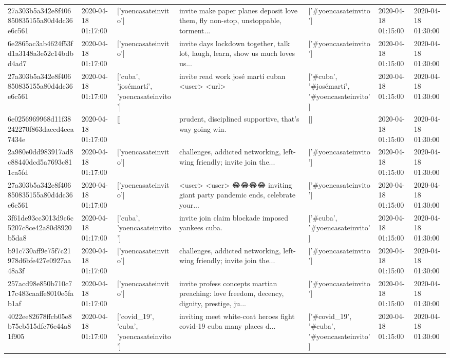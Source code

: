 \begin{tabular}{lllllll}
27a303b5a342e8f406850835155a80d4dc36e6c561 & 2020-04-18 01:17:00 & ['yoencasateinvito'] & invite make paper planes deposit love them, fly non-stop, unstoppable, torment... & ['#yoencasateinvito'] & 2020-04-18 01:15:00 & 2020-04-18 01:30:00 \\
6e2865ac3ab4624f53fd1a3148a3e52c14bdbd4ad7 & 2020-04-18 01:17:00 & ['yoencasateinvito'] & invite days lockdown together, talk lot, laugh, learn, show us much loves us... & ['#yoencasateinvito'] & 2020-04-18 01:15:00 & 2020-04-18 01:30:00 \\
27a303b5a342e8f406850835155a80d4dc36e6c561 & 2020-04-18 01:17:00 & ['cuba', 'josémartí', 'yoencasateinvito'] & invite read work josé martí cuban <user> <url> & ['#cuba', '#josémartí', '#yoencasateinvito'] & 2020-04-18 01:15:00 & 2020-04-18 01:30:00 \\
6e0256969968d11f38242270f863daccd4eea7434e & 2020-04-18 01:17:00 & [] & prudent, disciplined supportive, that's way going win. & [] & 2020-04-18 01:15:00 & 2020-04-18 01:30:00 \\
2a980e0dd983917ad8c88440dcd5a7693c811ca5fd & 2020-04-18 01:17:00 & ['yoencasateinvito'] & challenges, addicted networking, left-wing friendly; invite join the... & ['#yoencasateinvito'] & 2020-04-18 01:15:00 & 2020-04-18 01:30:00 \\
27a303b5a342e8f406850835155a80d4dc36e6c561 & 2020-04-18 01:17:00 & ['yoencasateinvito'] & <user> <user> 😂😂😂😂 inviting giant party pandemic ends, celebrate your... & ['#yoencasateinvito'] & 2020-04-18 01:15:00 & 2020-04-18 01:30:00 \\
3f61de93cc3013d9c6c5207c8ce42a80d8920b5da8 & 2020-04-18 01:17:00 & ['cuba', 'yoencasateinvito'] & invite join claim blockade imposed yankees cuba. & ['#cuba', '#yoencasateinvito'] & 2020-04-18 01:15:00 & 2020-04-18 01:30:00 \\
b91c730aff9e75f7c21978d6bfe427e0927aa48a3f & 2020-04-18 01:17:00 & ['yoencasateinvito'] & challenges, addicted networking, left-wing friendly; invite join the... & ['#yoencasateinvito'] & 2020-04-18 01:15:00 & 2020-04-18 01:30:00 \\
257acd98e850b710c717c483caaffe8010e5fab1af & 2020-04-18 01:17:00 & ['yoencasateinvito'] & invite profess concepts martian preaching: love freedom, decency, dignity, prestige, ju... & ['#yoencasateinvito'] & 2020-04-18 01:15:00 & 2020-04-18 01:30:00 \\
4022ee82678ffcb05e8b75eb515dfc76e44a81f905 & 2020-04-18 01:17:00 & ['covid_19', 'cuba', 'yoencasateinvito'] & inviting meet white-coat heroes fight covid-19 cuba many places d... & ['#covid_19', '#cuba', '#yoencasateinvito'] & 2020-04-18 01:15:00 & 2020-04-18 01:30:00 \\

\end{tabular}

